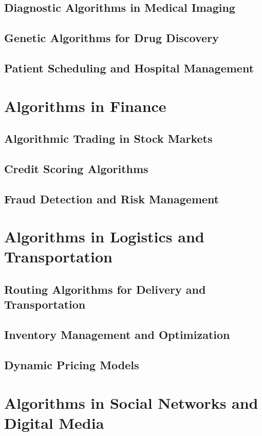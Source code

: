 \documentclass[12pt]{book} %
\begin{document}
\subsection{Diagnostic Algorithms in Medical Imaging}
\subsection{Genetic Algorithms for Drug Discovery}
\subsection{Patient Scheduling and Hospital Management}

\section{Algorithms in Finance}
\subsection{Algorithmic Trading in Stock Markets}
\subsection{Credit Scoring Algorithms}
\subsection{Fraud Detection and Risk Management}

\section{Algorithms in Logistics and Transportation}
\subsection{Routing Algorithms for Delivery and Transportation}
\subsection{Inventory Management and Optimization}
\subsection{Dynamic Pricing Models}

\section{Algorithms in Social Networks and Digital Media}
\end{document}
